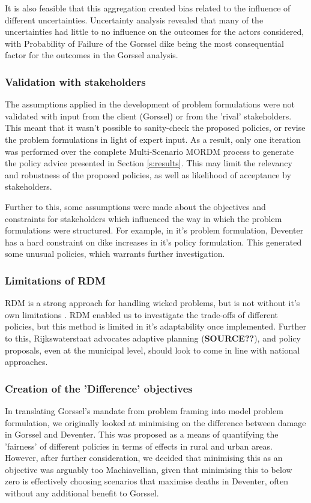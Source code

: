 It is also feasible that this aggregation created bias related to the influence of different uncertainties. Uncertainty analysis revealed that many of the uncertainties had little to no influence on the outcomes for the actors considered, with Probability of Failure of the Gorssel dike being the most consequential factor for the outcomes in the Gorssel analysis.

\subsubsection{Validation with stakeholders}
The assumptions applied in the development of problem formulations were not validated with input from the client (Gorssel) or from the 'rival' stakeholders. This meant that it wasn't possible to sanity-check the proposed policies, or revise the problem formulations in light of expert input. As a result, only one iteration was performed over the complete Multi-Scenario MORDM process to generate the policy advice presented in Section \ref{s:results}. This may limit the relevancy and robustness of the proposed policies, as well as likelihood of acceptance by stakeholders.

Further to this, some assumptions were made about the objectives and constraints for stakeholders which influenced the way in which the problem formulations were structured. For example, in it's problem formulation, Deventer has a hard constraint on dike increases in it's policy formulation. This generated some unusual policies, which warrants further investigation.

\subsubsection{Limitations of RDM}
RDM is a strong approach for handling wicked problems, but is not without it's own limitations \parencite{kwakkel_coping_2016}. RDM enabled us to investigate the trade-offs of different policies, but this method is limited in it's adaptability once implemented. Further to this, Rijkswaterstaat advocates adaptive planning (\textbf{SOURCE??}), and policy proposals, even at the municipal level, should look to come in line with national approaches.

\subsubsection{Creation of the 'Difference' objectives}
In translating Gorssel's mandate from problem framing into model problem formulation, we originally looked at minimising on the difference between damage in Gorssel and Deventer. This was proposed as a means of quantifying the 'fairness' of different policies in terms of effects in rural and urban areas. However, after further consideration, we decided that minimising this as an objective was arguably too Machiavellian, given that minimising this to below zero is effectively choosing scenarios that maximise deaths in Deventer, often without any additional benefit to Gorssel.

